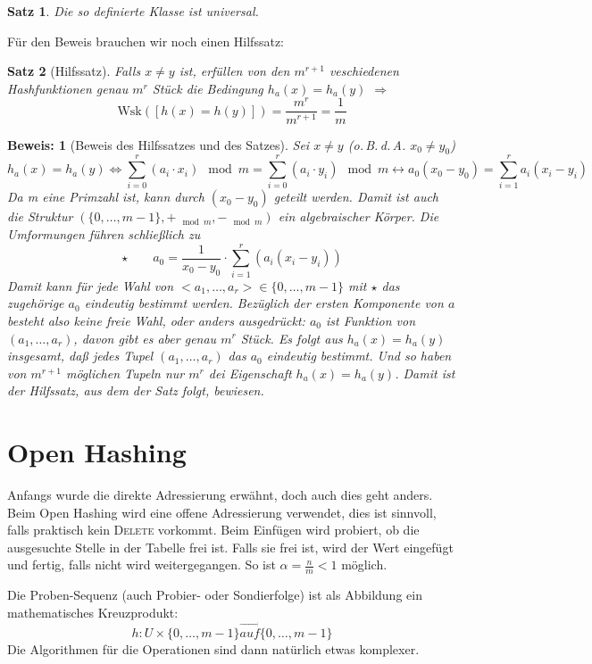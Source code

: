 \documentclass[ngerman,draft,parskip=half*,twoside]{scrreprt}
\theoremstyle{break}
\newtheorem{satz}{Satz}[chapter]
\theoremstyle{nonumberbreak}
\newtheorem{beweis}{Beweis:}
\begin{document}
\begin{satz}
Die so definierte Klasse ist universal.
\end{satz}
Für den Beweis brauchen wir noch einen Hilfssatz:
\begin{satz}[Hilfssatz]
Falls $x\neq y$ ist, erfüllen von den $m^{r+1}$ veschiedenen Hashfunktionen genau $m^r$ Stück die Bedingung
$h_a(x)=h_a(y)$ $\Rightarrow$ \[\mbox{Wsk}([h(x)=h(y)])=\frac{m^r}{m^{r+1}}=\frac{1}{m}\]
\end{satz}
\begin{beweis}[Beweis des Hilfssatzes und des Satzes]
  Sei $x\neq y$ (o.\,B.\,d.\,A. $x_0 \neq y_0$)
\[h_a(x)=h_a(y) \Leftrightarrow \sum_{i=0}^r (a_i \cdot x_i) \mod m=\sum_{i=0}^r (a_i \cdot y_i) \mod m \leftrightarrow
a_0(x_0-y_0)=\sum_{i=1}^r a_i (x_i- y_i)\]
Da m eine Primzahl ist, kann durch $(x_0-y_0)$ geteilt werden. Damit ist auch die Struktur $(\{0, \ldots, m-1\}, +_{\mod
m}, -_{\mod m})$ ein algebraischer Körper. Die Umformungen führen schließlich zu \[\star  \qquad 
a_0=\frac{1}{x_0-y_0} \cdot \sum_{i=1}^r (a_i (x_i- y_i))\]
Damit kann für jede Wahl von $<a_1, \ldots, a_r> \in \{0, \ldots, m-1\}$ mit $\star$ das zugehörige $a_0$ eindeutig
bestimmt werden. Bezüglich der ersten Komponente von $a$ besteht also keine freie Wahl, oder anders ausgedrückt: $a_0$
ist Funktion von $(a_1, \ldots, a_r)$, davon gibt es aber genau $m^r$ Stück. Es folgt aus $h_a(x)=h_a(y)$ insgesamt,
daß jedes Tupel $(a_1, \ldots, a_r)$ das $a_0$ eindeutig bestimmt. Und so haben von $m^{r+1}$ möglichen Tupeln nur
$m^r$ dei Eigenschaft $h_a(x)=h_a(y)$. Damit ist der Hilfssatz, aus dem der Satz folgt, bewiesen.
\end{beweis}

\section{Open Hashing}
Anfangs wurde die direkte Adressierung erwähnt, doch auch dies geht anders. Beim Open Hashing wird eine offene
Adressierung verwendet, dies ist sinnvoll, falls praktisch kein \textsc{Delete} vorkommt. Beim Einfügen wird probiert,
ob die ausgesuchte Stelle in der Tabelle frei ist. Falls sie frei ist, wird der Wert eingefügt und fertig, falls nicht
wird weitergegangen. So ist $\alpha=\frac{n}{m}<1$ möglich.

Die Proben-Sequenz (auch Probier- oder Sondierfolge) ist als Abbildung ein mathematisches Kreuzprodukt:
\[h: U \times \{0, \ldots, m-1\} \stackrel{\rightarrow}{auf}\{0, \ldots, m-1\}\]
Die Algorithmen für die Operationen sind dann natürlich etwas komplexer.
\end{document}
